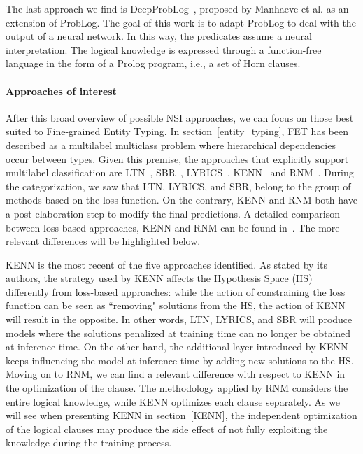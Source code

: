 \begin{itemize}
    The last approach we find is DeepProbLog~\cite{deepproblog}, proposed by Manhaeve et al. as an extension of ProbLog. The goal of this work is to adapt ProbLog to deal with the output of a neural network. In this way, the predicates assume a neural interpretation. The logical knowledge is expressed through a function-free language in the form of a Prolog program, i.e., a set of Horn clauses.
\end{itemize}

\paragraph{Approaches of interest}
After this broad overview of possible NSI approaches, we can focus on those best suited to Fine-grained Entity Typing. In section~\ref{entity_typing}, FET has been described as a multilabel multiclass problem where hierarchical dependencies occur between types. Given this premise, the approaches that explicitly support multilabel classification are LTN~\cite{ltn}, SBR~\cite{sbr}, LYRICS~\cite{lyrics}, KENN~\cite{kenn} and RNM~\cite{rnm}. During the categorization, we saw that LTN, LYRICS, and SBR, belong to the group of methods based on the loss function. On the contrary, KENN and RNM both have a post-elaboration step to modify the final predictions. A detailed comparison between loss-based approaches, KENN and RNM can be found in~\cite{daniele2021neural}. The more relevant differences will be highlighted below.

KENN is the most recent of the five approaches identified. As stated by its authors, the strategy used by KENN affects the Hypothesis Space (HS) differently from loss-based approaches: while the action of constraining the loss function can be seen as ``removing" solutions from the HS, the action of KENN will result in the opposite. In other words, LTN, LYRICS, and SBR will produce models where the solutions penalized at training time can no longer be obtained at inference time. On the other hand, the additional layer introduced by KENN keeps influencing the model at inference time by adding new solutions to the HS. Moving on to RNM, we can find a relevant difference with respect to KENN in the optimization of the clause. The methodology applied by RNM considers the entire logical knowledge, while KENN optimizes each clause separately. As we will see when presenting KENN in section~\ref{KENN}, the independent optimization of the logical clauses may produce the side effect of not fully exploiting the knowledge during the training process.


